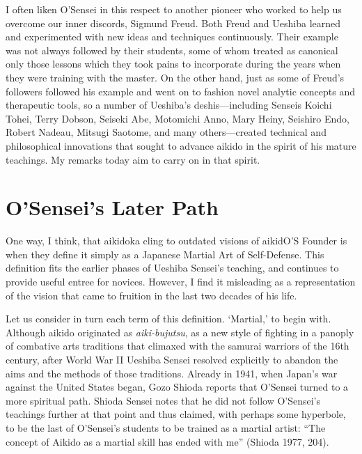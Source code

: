 I often liken O'Sensei in this respect to another pioneer who worked to help us overcome our inner discords, Sigmund Freud. Both Freud and Ueshiba learned and experimented with new ideas and techniques continuously. Their example was not always followed by their students, some of whom treated as canonical only those lessons which they took pains to incorporate during the years when they were training with the master. On the other hand, just as some of Freud's followers followed his example and went on to fashion novel analytic concepts and therapeutic tools, so a number of Ueshiba's deshis---including Senseis Koichi Tohei, Terry Dobson, Seiseki Abe, Motomichi Anno, Mary Heiny, Seishiro Endo, Robert Nadeau, Mitsugi Saotome, and many others---created technical and philosophical innovations that sought to advance aikido in the spirit of his mature teachings. My remarks today aim to carry on in that spirit.

\section*{O'Sensei's Later Path}

One way, I think, that aikidoka cling to outdated visions of aikidO'S Founder is when they define it simply as a Japanese Martial Art of Self-Defense. This definition fits the earlier phases of Ueshiba Sensei's teaching, and continues to provide useful entree for novices. However, I find it misleading as a representation of the vision that came to fruition in the last two decades of his life. 

Let us consider in turn each term of this definition. `Martial,' to begin with. Although aikido originated as \emph{aiki-bujutsu}, as a new style of fighting in a panoply of combative arts traditions that climaxed with the samurai warriors of the 16th century, after World War II Ueshiba Sensei resolved explicitly to abandon the aims and the methods of those traditions. Already in 1941, when Japan's war against the United States began, Gozo Shioda reports that O'Sensei turned to a more spiritual path. Shioda Sensei notes that he did not follow O'Sensei's teachings further at that point and thus claimed, with perhaps some hyperbole, to be the last of O'Sensei's students to be trained as a martial artist: ``The concept of Aikido as a martial skill has ended with me'' (Shioda 1977, 204). 


